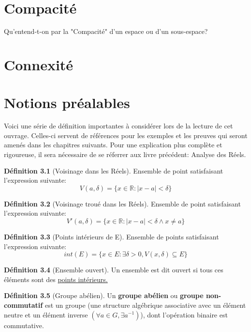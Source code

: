 \documentclass[12pt]{book}
\let\Bbb\mathbb
\theoremstyle{definition}
\newtheorem{definition}{Définition}[section]
\begin{document}
\chapter{Compacité}
Qu'entend-t-on par la "Compacité" d'un espace ou d'un sous-espace?
\chapter{Connexité}

\appendix
\chapter{Notions préalables}
Voici une série de définition importantes à considérer lors de la lecture de cet ouvrage. Celles-ci servent
de références pour les exemples et les preuves qui seront amenés dans les chapitres suivants. Pour une explication
plus complète et rigoureuse, il sera nécessaire de se réferrer aux livre précédent: Analyse des Réels.

\begin{definition}[Voisinage dans les Réels]
    \label{def:voisinage_reels}
    Ensemble de point satisfaisant l'expression
    suivante: $$V(a, \delta) = \{ x \in \Bbb R : |x - a| < \delta \}$$
\end{definition}

\begin{definition}[Voisinage troué dans les Réels]
    \label{def:voisinage_troue_reels}
    Ensemble de point satisfaisant l'expression
    suivante: $$V'(a, \delta) = \{ x \in \Bbb R : |x - a| < \delta \land x \neq a \}$$
\end{definition}

\begin{definition}[Points intérieurs de E]
    \label{def:point_int}
    Ensemble de points satisfaisant l'expression
    suivante: $$int(E) = \{ x \in E : \exists \delta > 0, V(x, \delta) \subseteq E \} $$
\end{definition}

\begin{definition}[Ensemble ouvert]
    \label{def:ensemble_ouvert}
    Un ensemble est dit ouvert si tous ces éléments sont des \hyperref[def:point_int]{points intérieurs.}
\end{definition}

\begin{definition}[Groupe abélien]
    \label{def:groupe_abelien}
    Un \textbf{groupe abélien} ou \textbf{groupe non-commutatif} est un groupe
    (une structure algébrique associative avec un élément neutre et un élément inverse $(\forall a \in G, \exists a^{-1})$), 
    dont l'opération binaire est commutative.
\end{definition}
\end{document}
